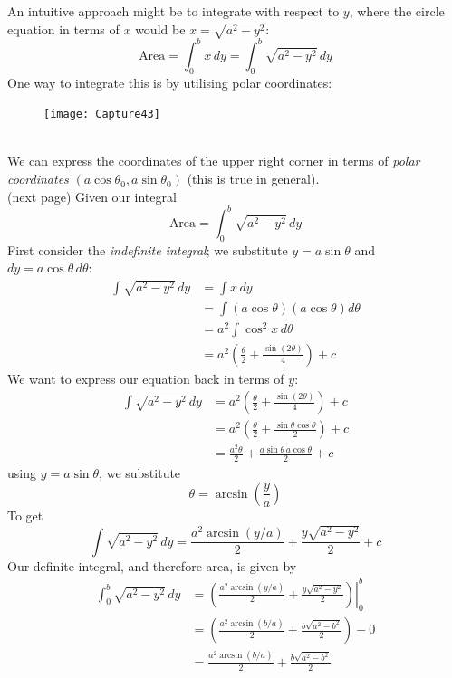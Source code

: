 \documentclass{report}
\begin{document}
An intuitive approach might be to integrate with respect to $y$, where the circle equation 
in terms of $x$ would be $x=\sqrt{a^2-y^2}$:
\begin{equation*}
\text{Area}=\int_0^bx\,dy=\int_0^b\sqrt{a^2-y^2}\,dy
\end{equation*}
One way to integrate this is by utilising polar coordinates:
\begin{figure}[h]
\texttt{[image: Capture43]}\\
\centering
{} 
\end{figure}\\
We can express the coordinates of the upper right corner in terms of \textit{polar coordinates} 
$(a\cos\theta_0,a\sin\theta_0)$ (this is true in general).\\
(next page)
\newpage
\noindent Given our integral
\begin{equation*}
\text{Area}=\int_0^b\sqrt{a^2-y^2}\,dy
\end{equation*}
First consider the \textit{indefinite integral};
we substitute $y=a\sin\theta$ and\\ $dy=a\cos\theta\,d\theta$:
\begin{align*}
\int\sqrt{a^2-y^2}\,dy&=\int x\,dy\\
&=\int(a\cos\theta)(a\cos\theta)d\theta\\
&=a^2\int\cos^2x\,d\theta\\
&=a^2\left(\frac{\theta}{2}+\frac{\sin(2\theta)}{4}\right)+c
\end{align*}
We want to express our equation back in terms of $y$:
\begin{align*}
\int\sqrt{a^2-y^2}\,dy&=a^2\left(\frac{\theta}{2}+\frac{\sin(2\theta)}{4}\right)+c\\
&=a^2\left(\frac{\theta}{2}+\frac{\sin\theta\cos\theta}{2}\right)+c\\
&=\frac{a^2\theta}{2}+\frac{a\sin\theta\,a\cos\theta}{2}+c
\end{align*}
using $y=a\sin\theta$, we substitute
\begin{equation*}
\theta=\arcsin\left(\frac{y}{a}\right)
\end{equation*}
To get
\begin{equation*}
\int\sqrt{a^2-y^2}\,dy=\frac{a^2\arcsin(y/a)}{2}+\frac{y\sqrt{a^2-y^2}}{2}+c
\end{equation*}
Our definite integral, and therefore area, is given by
\begin{align*}
\int_0^b\sqrt{a^2-y^2}\,dy
&=\left.\left(\frac{a^2\arcsin(y/a)}{2}+\frac{y\sqrt{a^2-y^2}}{2}\right)\right|^b_0\\
&=\left(\frac{a^2\arcsin(b/a)}{2}+\frac{b\sqrt{a^2-b^2}}{2}\right)-0\\
&=\frac{a^2\arcsin(b/a)}{2}+\frac{b\sqrt{a^2-b^2}}{2}
\end{align*}
\newpage
\end{document}
